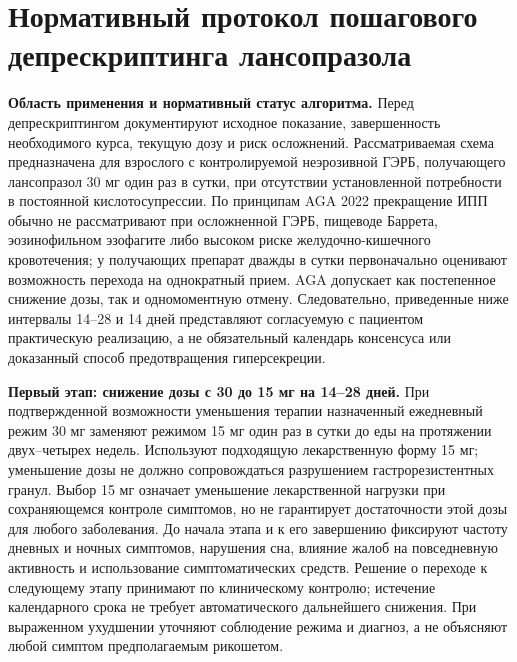 \documentclass[11pt,a4paper,notitlepage]{report}
\newcommand{\src}[1]{\unskip\space\cite{#1}}
\begin{document}
\section{Нормативный протокол пошагового депрескриптинга лансопразола}
\label{sec:deprescribing-algorithm}
\textbf{Область применения и нормативный статус алгоритма.} Перед депрескриптингом документируют исходное показание, завершенность необходимого курса, текущую дозу и риск осложнений. Рассматриваемая схема предназначена для взрослого с контролируемой неэрозивной ГЭРБ, получающего лансопразол 30 мг один раз в сутки, при отсутствии установленной потребности в постоянной кислотосупрессии. По принципам AGA 2022 прекращение ИПП обычно не рассматривают при осложненной ГЭРБ, пищеводе Баррета, эозинофильном эзофагите либо высоком риске желудочно-кишечного кровотечения; у получающих препарат дважды в сутки первоначально оценивают возможность перехода на однократный прием. AGA допускает как постепенное снижение дозы, так и одномоментную отмену. Следовательно, приведенные ниже интервалы 14--28 и 14 дней представляют согласуемую с пациентом практическую реализацию, а не обязательный календарь консенсуса или доказанный способ предотвращения гиперсекреции.\src{agadepres,withdrawfarrell2017}

\textbf{Первый этап: снижение дозы с 30 до 15 мг на 14--28 дней.} При подтвержденной возможности уменьшения терапии назначенный ежедневный режим 30 мг заменяют режимом 15 мг один раз в сутки до еды на протяжении двух--четырех недель. Используют подходящую лекарственную форму 15 мг; уменьшение дозы не должно сопровождаться разрушением гастрорезистентных гранул. Выбор 15 мг означает уменьшение лекарственной нагрузки при сохраняющемся контроле симптомов, но не гарантирует достаточности этой дозы для любого заболевания.\src{uslabel,nice} До начала этапа и к его завершению фиксируют частоту дневных и ночных симптомов, нарушения сна, влияние жалоб на повседневную активность и использование симптоматических средств. Решение о переходе к следующему этапу принимают по клиническому контролю; истечение календарного срока не требует автоматического дальнейшего снижения. При выраженном ухудшении уточняют соблюдение режима и диагноз, а не объясняют любой симптом предполагаемым рикошетом.\src{withdrawfarrell2017,acggerd}
\end{document}
